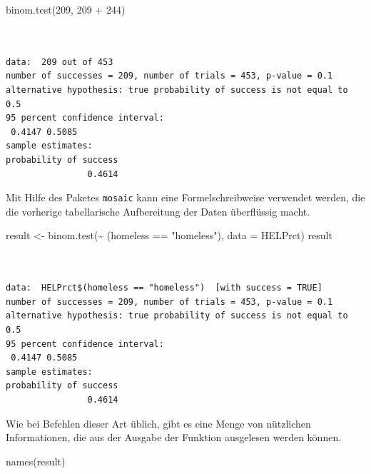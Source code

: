 \documentclass[
  ngerman,
]{scrbook}
\newenvironment{Shaded}{\begin{snugshade}}{\end{snugshade}}
\newcommand{\AttributeTok}[1]{\textcolor[rgb]{0.77,0.63,0.00}{#1}}
\newcommand{\DecValTok}[1]{\textcolor[rgb]{0.00,0.00,0.81}{#1}}
\newcommand{\FunctionTok}[1]{\textcolor[rgb]{0.00,0.00,0.00}{#1}}
\newcommand{\NormalTok}[1]{#1}
\newcommand{\OtherTok}[1]{\textcolor[rgb]{0.56,0.35,0.01}{#1}}
\newcommand{\SpecialCharTok}[1]{\textcolor[rgb]{0.00,0.00,0.00}{#1}}
\newcommand{\StringTok}[1]{\textcolor[rgb]{0.31,0.60,0.02}{#1}}
\begin{document}
\begin{Shaded}
\begin{Highlighting}[]
\FunctionTok{binom.test}\NormalTok{(}\DecValTok{209}\NormalTok{, }\DecValTok{209} \SpecialCharTok{+} \DecValTok{244}\NormalTok{)}
\end{Highlighting}
\end{Shaded}

\begin{verbatim}


data:  209 out of 453
number of successes = 209, number of trials = 453, p-value = 0.1
alternative hypothesis: true probability of success is not equal to 0.5
95 percent confidence interval:
 0.4147 0.5085
sample estimates:
probability of success 
                0.4614 
\end{verbatim}

Mit Hilfe des Paketes \texttt{mosaic} kann eine Formelschreibweise verwendet werden, die die vorherige tabellarische Aufbereitung der Daten überflüssig macht.

\begin{Shaded}
\begin{Highlighting}[]
\NormalTok{result }\OtherTok{\textless{}{-}} \FunctionTok{binom.test}\NormalTok{(}\SpecialCharTok{\textasciitilde{}}\NormalTok{ (homeless }\SpecialCharTok{==} \StringTok{"homeless"}\NormalTok{), }
                     \AttributeTok{data =}\NormalTok{ HELPrct)}
\NormalTok{result}
\end{Highlighting}
\end{Shaded}

\begin{verbatim}


data:  HELPrct$(homeless == "homeless")  [with success = TRUE]
number of successes = 209, number of trials = 453, p-value = 0.1
alternative hypothesis: true probability of success is not equal to 0.5
95 percent confidence interval:
 0.4147 0.5085
sample estimates:
probability of success 
                0.4614 
\end{verbatim}

Wie bei Befehlen dieser Art üblich, gibt es eine Menge von nützlichen Informationen, die aus der Ausgabe der Funktion ausgelesen werden können.

\begin{Shaded}
\begin{Highlighting}[]
\FunctionTok{names}\NormalTok{(result)}
\end{Highlighting}
\end{Shaded}
\end{document}
